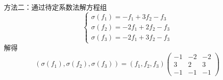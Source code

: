 \begin{exercise}
\begin{exgroup}
\begin{answer}
\begin{enumerate}
                      方法二：通过待定系数法解方程组
                      \[ \begin{cases}
                              \sigma(f_1) = -f_1 + 3 f_2 - f_3   \\
                              \sigma(f_2) = -2 f_1 + 2 f_2 - f_3 \\
                              \sigma(f_3) = -2 f_1 + 3 f_2 - f_3
                          \end{cases} \]
                      解得
                      \[ (\sigma(f_1), \sigma(f_2), \sigma(f_3)) = (f_1, f_2, f_3) \begin{pmatrix}
                              -1 & -2 & -2 \\
                              3  & 2  & 3  \\
                              -1 & -1 & -1
                          \end{pmatrix} \]


\end{enumerate}
\end{answer}
\end{exgroup}
\end{exercise}
